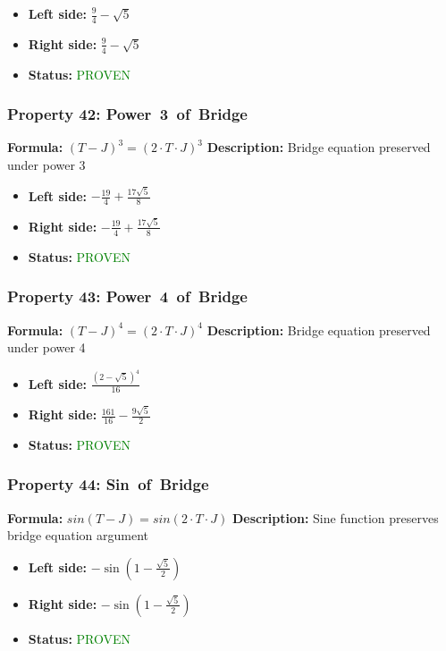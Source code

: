 \begin{itemize}
\item \textbf{Left side:} $\frac{9}{4} - \sqrt{5}$
\item \textbf{Right side:} $\frac{9}{4} - \sqrt{5}$
\item \textbf{Status:} \textcolor{green}{PROVEN}
\end{itemize}

\subsubsection*{Property 42: Power~3~of~Bridge}
\textbf{Formula:} $(T-J)^3 = (2 \cdot T \cdot J)^3$
\textbf{Description:} Bridge equation preserved under power 3

\begin{itemize}
\item \textbf{Left side:} $- \frac{19}{4} + \frac{17 \sqrt{5}}{8}$
\item \textbf{Right side:} $- \frac{19}{4} + \frac{17 \sqrt{5}}{8}$
\item \textbf{Status:} \textcolor{green}{PROVEN}
\end{itemize}

\subsubsection*{Property 43: Power~4~of~Bridge}
\textbf{Formula:} $(T-J)^4 = (2 \cdot T \cdot J)^4$
\textbf{Description:} Bridge equation preserved under power 4

\begin{itemize}
\item \textbf{Left side:} $\frac{\left(2 - \sqrt{5}\right)^{4}}{16}$
\item \textbf{Right side:} $\frac{161}{16} - \frac{9 \sqrt{5}}{2}$
\item \textbf{Status:} \textcolor{green}{PROVEN}
\end{itemize}

\subsubsection*{Property 44: Sin~of~Bridge}
\textbf{Formula:} $sin(T-J) = sin(2 \cdot T \cdot J)$
\textbf{Description:} Sine function preserves bridge equation argument

\begin{itemize}
\item \textbf{Left side:} $- \sin{\left(1 - \frac{\sqrt{5}}{2} \right)}$
\item \textbf{Right side:} $- \sin{\left(1 - \frac{\sqrt{5}}{2} \right)}$
\item \textbf{Status:} \textcolor{green}{PROVEN}
\end{itemize}

